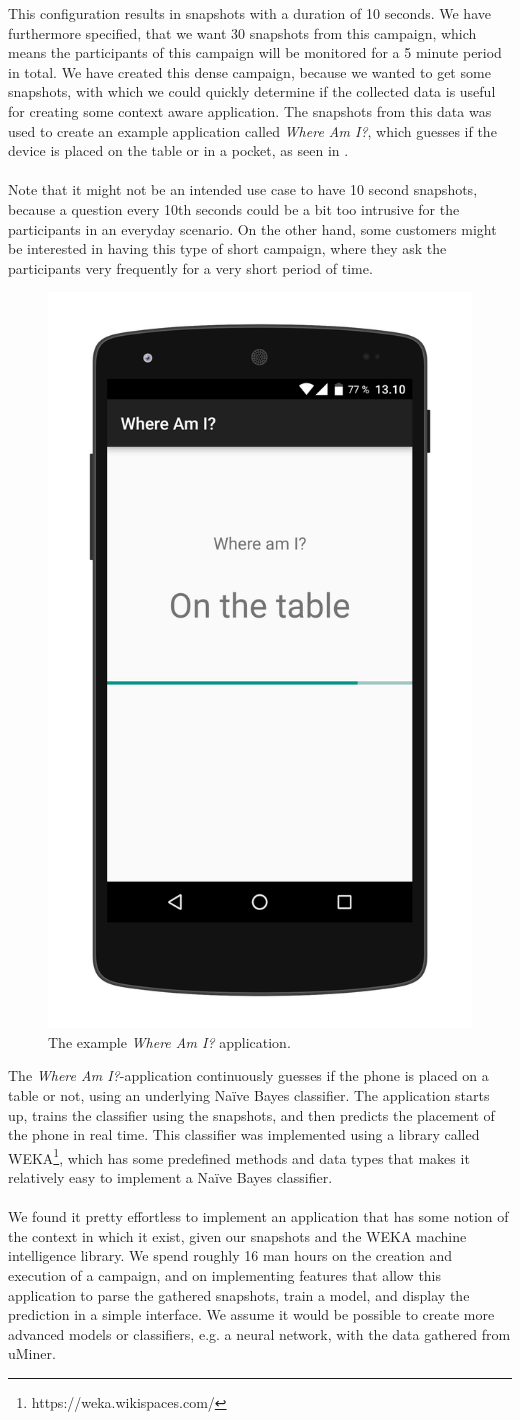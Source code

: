 This configuration results in snapshots with a duration of 10 seconds. We have furthermore specified, that we want 30 snapshots from this campaign, which means the participants of this campaign will be monitored for a 5 minute period in total. We have created this dense campaign, because we wanted to get some snapshots, with which we could quickly determine if the collected data is useful for creating some context aware application. The snapshots from this data was used to create an example application called \emph{Where Am I?}, which guesses if the device is placed on the table or in a pocket, as seen in .
\\\\
Note that it might not be an intended use case to have 10 second snapshots, because a question every 10th seconds could be a bit too intrusive for the participants in an everyday scenario. On the other hand, some customers might be interested in having this type of short campaign, where they ask the participants very frequently for a very short period of time. 

\begin{figure}[!htbp]
    \centering
    \includegraphics[width=.35\textwidth ]{graphic/quality_assurance/where_am_i_app.png}
    \caption{The example \emph{Where Am I?} application.}
    \label{fig:where_am_i_app}
\end{figure}
\FloatBarrier

The \emph{Where Am I?}-application continuously guesses if the phone is placed on a table or not, using an underlying Naïve Bayes classifier. The application starts up, trains the classifier using the snapshots, and then predicts the placement of the phone in real time. This classifier was implemented using a library called WEKA\footnote{https://weka.wikispaces.com/}, which has some predefined methods and data types that makes it relatively easy to implement a Naïve Bayes classifier.
\\\\
We found it pretty effortless to implement an application that has some notion of the context in which it exist, given our snapshots and the WEKA machine intelligence library. We spend roughly 16 man hours on the creation and execution of a campaign, and on implementing features that allow this application to parse the gathered snapshots, train a model, and display the prediction in a simple interface. We assume it would be possible to create more advanced models or classifiers, e.g. a neural network, with the data gathered from uMiner.
